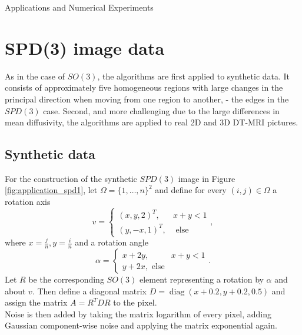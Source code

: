 \begin{chapter}{Applications and Numerical Experiments}


\FloatBarrier
\section{SPD(3) image data} %
\label{sec:SPD(3) image data}
As in the case of $SO(3)$, the algorithms are first applied to synthetic data. It consists of 
approximately five homogeneous regions with large changes in the principal direction
when moving from one region to another, - the edges in the $SPD(3)$ case.
Second, and more challenging due to the large differences in mean diffusivity, the
algorithms are applied to real 2D and 3D DT-MRI pictures.


\subsection{Synthetic data} %
\label{sub:SyntheticdataSPD}
For the construction of the synthetic $SPD(3)$ image in Figure \ref{fig:application_spd1}, let $\Omega=\lbrace 1,\ldots,n \rbrace^2$ and define for every $(i,j)\in\Omega$
a rotation axis
\begin{equation}
	v = \begin{cases}
	    (x,y,2)^{T}, & x+y<1\\
	    (y,-x,1)^{T}, & \text{ else}
	\end{cases},
\end{equation}
where $x=\frac{j}{n}, y=\frac{i}{n}$ and a rotation angle
\begin{equation}
    \alpha = \begin{cases}
	   x+2y, & x+y<1\\
	   y+2x, \text{ else}
    \end{cases}.
\end{equation}
Let $R$ be the corresponding $SO(3)$ element representing a rotation by $\alpha$ and about $v$. Then define a diagonal matrix $D=\operatorname{diag}(x+0.2,y+0.2,0.5)$
and assign the matrix $A=R^{T}DR$ to the pixel.\\
Noise is then added by taking the matrix logarithm of every pixel, adding Gaussian component-wise noise and applying the matrix exponential again.
\begin{figure}[h!]
    \centering
\end{figure}
\end{chapter}
